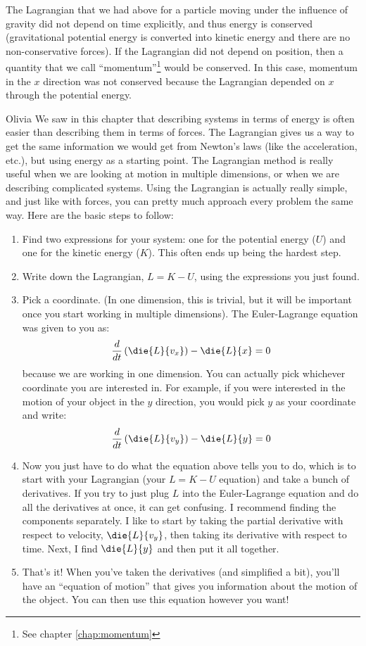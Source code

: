 The Lagrangian that we had above for a particle moving under the influence of gravity did not depend on time explicitly, and thus energy is conserved (gravitational potential energy is converted into kinetic energy and there are no non-conservative forces). If the Lagrangian did not depend on position, then a quantity that we call ``momentum''\footnote{See chapter \ref{chap:momentum}} would be conserved. In this case, momentum in the $x$ direction was not conserved because the Lagrangian depended on $x$ through the potential energy. 
\newpage
\begin{studentOpinion}{Olivia}
We saw in this chapter that describing systems in terms of energy is often easier than describing them in terms of forces. The Lagrangian gives us a way to get the same information we would get from Newton's laws (like the acceleration, etc.), but using energy as a starting point. The Lagrangian method is really useful when we are looking at motion in multiple dimensions, or when we are describing complicated systems. Using the Lagrangian is actually really simple, and just like with forces, you can pretty much approach every problem the same way. Here are the basic steps to follow:
\begin{enumerate}
\item Find two expressions for your system: one for the potential energy ($U$) and one for the kinetic energy ($K$). This often ends up being the hardest step.
\item Write down the Lagrangian, $L=K-U$, using the expressions you just found.
\item Pick a coordinate. (In one dimension, this is trivial, but it will be important once you start working in multiple dimensions). The Euler-Lagrange equation was given to you as:
\begin{align*}
\frac{d}{dt}\left(\die{L}{v_x}\right)-\die{L}{x} = 0
\end{align*}
because we are working in one dimension. You can actually pick whichever coordinate you are interested in. For example, if you were interested in the motion of your object in the $y$ direction, you would pick $y$ as your coordinate and write:
\begin{align*}
\frac{d}{dt}\left(\die{L}{v_y}\right)-\die{L}{y} = 0
\end{align*}
\item Now you just have to do what the equation above tells you to do, which is to start with your Lagrangian (your $L=K-U$ equation) and take a bunch of derivatives. If you try to just plug $L$ into the Euler-Lagrange equation and do all the derivatives at once, it can get confusing. I recommend finding the components separately. I like to start by taking the partial derivative with respect to velocity, $\die{L}{v_y}$, then taking its derivative with respect to time. Next, I find $\die{L}{y}$ and then put it all together.
\item That's it! When you've taken the derivatives (and simplified a bit), you'll have an ``equation of motion'' that gives you information about the motion of the object. You can then use this equation however you want! 
\end{enumerate}
\end{studentOpinion}

